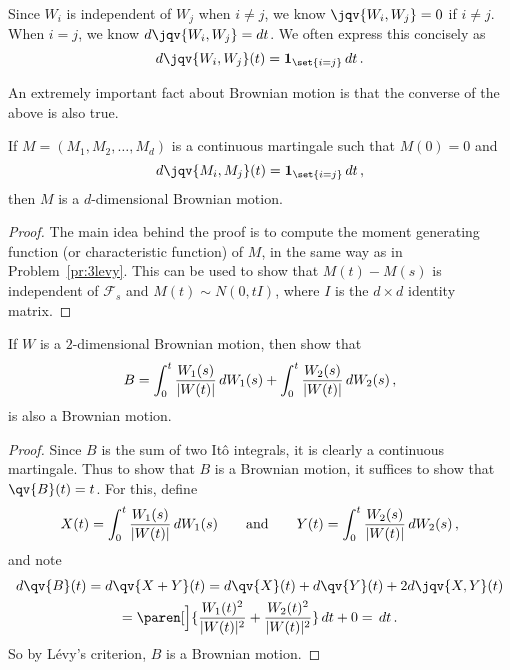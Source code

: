 \begin{remark}
  Since $W_i$ is independent of $W_j$ when $i \neq j$, we know $\jqv{W_i, W_j} = 0$ if $i \neq j$.
  When $i = j$, we know $d\jqv{W_i, W_j} = dt$.
  We often express this concisely as
  \begin{equation*}
    d\jqv{W_i, W_j}(t) = \one_{\set{i = j}} \, dt\,.
  \end{equation*}
\end{remark}

An extremely important fact about Brownian motion is that the converse of the above is also true.

\begin{theorem}[L\'evy]
  If $M = (M_1, M_2, \dots, M_d)$ is a continuous martingale such that $M(0) = 0$ and
  \begin{equation*}
    d\jqv{M_i, M_j}(t) = \one_{\set{i = j}} \, dt\,,
  \end{equation*}
  then $M$ is a $d$-dimensional Brownian motion.
\end{theorem}
\begin{proof}
  The main idea behind the proof is to compute the moment generating function (or characteristic function) of $M$, in the same way as in Problem~\ref{pr:3levy}.
  This can be used to show that $M(t) - M(s)$ is independent of $\mathcal F_s$ and $M(t) \sim N(0, t I)$, where $I$ is the $d \times d$ identity matrix.
\end{proof}

\begin{example}
  If $W$ is a $2$-dimensional Brownian motion, then show that
  \begin{equation*}
    B = \int_0^t \frac{W_1(s)}{\lvert W(t)\rvert} \, dW_1(s)
	+ \int_0^t \frac{W_2(s)}{\lvert W(t)\rvert} \, dW_2(s)\,,
  \end{equation*}
  is also a Brownian motion.
\end{example}
\begin{proof}
  Since $B$ is the sum of two It\^o integrals, it is clearly a continuous martingale.
  Thus to show that $B$ is a Brownian motion, it suffices to show that $\qv{B}(t) = t$.
  For this, define
  \begin{equation*}
    X(t) = \int_0^t \frac{W_1(s)}{\lvert W(t)\rvert} \, dW_1(s)
    \qquad\text{and}\qquad
    Y(t) = \int_0^t \frac{W_2(s)}{\lvert W(t)\rvert} \, dW_2(s)\,,
  \end{equation*}
  and note
  \begin{multline*}
    d\qv{B}(t) = d\qv{X+Y}(t)
      = d\qv{X}(t) + d\qv{Y}(t) + 2d\jqv{X, Y}(t)
    \\
      = \paren[\Big]{\frac{W_1(t)^2}{\abs{W(t)}^2}
	+ \frac{W_2(t)^2}{\abs{W(t)}^2}} \, dt
	+ 0
      = \, dt\,.
  \end{multline*}
  So by L\'evy's criterion, $B$ is a Brownian motion.
\end{proof}

